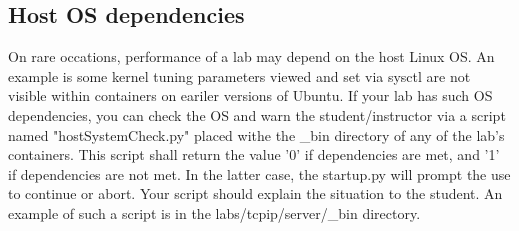 \documentclass[12pt]{article}
\begin{document}
\subsection{Host OS dependencies}
On rare occations, performance of a lab may depend on the host Linux OS.  An example is some
kernel tuning parameters viewed and set via sysctl are not visible within containers on eariler versions
of Ubuntu.  If your lab has such OS dependencies, you can check the OS and warn the student/instructor via a script
named "hostSystemCheck.py" placed withe the \_bin directory of any of the lab's containers.  This script shall
return the value '0' if dependencies are met, and '1' if dependencies are not met.  In the latter case, the 
startup.py will prompt the use to continue or abort.  Your script should explain the situation to the student.
An example of such a script is in the labs/tcpip/server/\_bin directory.
\end{document}
